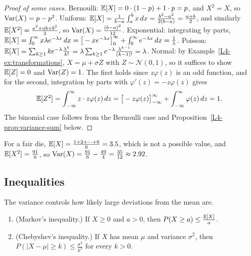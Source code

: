 \begin{proof}[Proof of some cases]
    Bernoulli: $\mathbb{E}[X] = 0 \cdot (1 - p) + 1 \cdot p = p$, and $X^2 = X$, so $\operatorname{Var}(X) = p - p^2$. Uniform: $\mathbb{E}[X] = \frac{1}{b - a}\int_a^b x\, dx = \frac{b^2 - a^2}{2(b - a)} = \frac{a + b}{2}$, and similarly $\mathbb{E}[X^2] = \frac{a^2 + ab + b^2}{3}$, so $\operatorname{Var}(X) = \frac{(b - a)^2}{12}$. Exponential: integrating by parts, $\mathbb{E}[X] = \int_0^\infty x\lambda e^{-\lambda x}\, dx = \big[-xe^{-\lambda x}\big]_0^\infty + \int_0^\infty e^{-\lambda x}\, dx = \frac{1}{\lambda}$. Poisson: $\mathbb{E}[X] = \sum_{k \geq 1} k e^{-\lambda}\frac{\lambda^k}{k!} = \lambda\sum_{k \geq 1} e^{-\lambda}\frac{\lambda^{k-1}}{(k-1)!} = \lambda$. Normal: by Example~\ref{L4-ex:transformations}, $X = \mu + \sigma Z$ with $Z \sim \mathcal{N}(0, 1)$, so it suffices to show $\mathbb{E}[Z] = 0$ and $\operatorname{Var}(Z) = 1$. The first holds since $z\varphi(z)$ is an odd function, and for the second, integration by parts with $\varphi'(z) = -z\varphi(z)$ gives
    \[\mathbb{E}[Z^2] = \int_{-\infty}^\infty z \cdot z\varphi(z) \, dz = \big[-z\varphi(z)\big]_{-\infty}^\infty + \int_{-\infty}^\infty \varphi(z) \, dz = 1.\]
    The binomial case follows from the Bernoulli case and Proposition~\ref{L4-prop:variance-sum} below.
\end{proof}

\begin{example}\label{L4-ex:die-moments}
    For a fair die, $\mathbb{E}[X] = \frac{1 + 2 + \cdots + 6}{6} = 3.5$, which is not a possible value, and $\mathbb{E}[X^2] = \frac{91}{6}$, so $\operatorname{Var}(X) = \frac{91}{6} - \frac{49}{4} = \frac{35}{12} \approx 2.92$.
\end{example}

\subsection{Inequalities}

The variance controls how likely large deviations from the mean are.

\begin{proposition}\label{L4-prop:markov}
    \begin{enumerate}
        \item (Markov's inequality.) If $X \geq 0$ and $a > 0$, then $P(X \geq a) \leq \frac{\mathbb{E}[X]}{a}$.
        \item (Chebyshev's inequality.) If $X$ has mean $\mu$ and variance $\sigma^2$, then $P(|X - \mu| \geq k) \leq \frac{\sigma^2}{k^2}$ for every $k > 0$.
    \end{enumerate}
\end{proposition}

